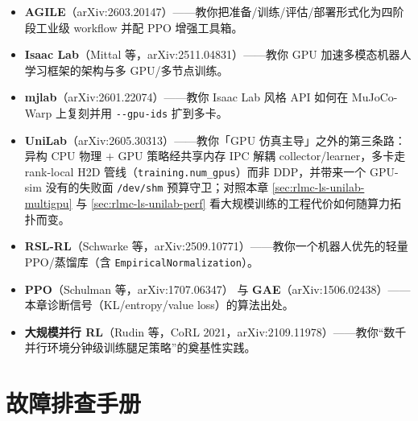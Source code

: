 \begin{itemize}
\item \textbf{AGILE}（arXiv:2603.20147）\cite{zhao2026agile}——教你把准备/训练/评估/部署形式化为四阶段工业级 workflow 并配 PPO 增强工具箱。
\item \textbf{Isaac Lab}（Mittal 等，arXiv:2511.04831）\cite{mittal2025isaaclab}——教你 GPU 加速多模态机器人学习框架的架构与多 GPU/多节点训练。
\item \textbf{mjlab}（arXiv:2601.22074）\cite{mjlab2026}——教你 Isaac Lab 风格 API 如何在 MuJoCo-Warp 上复刻并用 \verb|--gpu-ids| 扩到多卡。
\item \textbf{UniLab}（arXiv:2605.30313）\cite{unilab2026}——教你「GPU 仿真主导」之外的第三条路：异构 CPU 物理 $+$ GPU 策略经共享内存 IPC 解耦 collector/learner，多卡走 rank-local H2D 管线（\verb|training.num_gpus|）而非 DDP，并带来一个 GPU-sim 没有的失败面 \verb|/dev/shm| 预算守卫；对照本章 \cref{sec:rlmc-ls-unilab-multigpu} 与 \cref{sec:rlmc-ls-unilab-perf} 看大规模训练的工程代价如何随算力拓扑而变。
\item \textbf{RSL-RL}（Schwarke 等，arXiv:2509.10771）\cite{schwarke2025rslrl}——教你一个机器人优先的轻量 PPO/蒸馏库（含 \verb|EmpiricalNormalization|）。
\item \textbf{PPO}（Schulman 等，arXiv:1707.06347）\cite{schulman2017ppo} 与 \textbf{GAE}（arXiv:1506.02438）\cite{schulman2016gae}——本章诊断信号（KL/entropy/value loss）的算法出处。
\item \textbf{大规模并行 RL}（Rudin 等，CoRL 2021，arXiv:2109.11978）\cite{rudin2022legged}——教你“数千并行环境分钟级训练腿足策略”的奠基性实践。
\end{itemize}

\section{故障排查手册}
\label{sec:rlmc-ls-troubleshoot}

